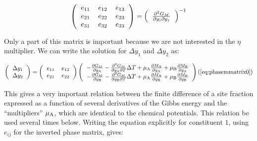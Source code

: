 \documentclass[12pt]{article}
\begin{document}
\[ \left(
\begin{tabular}{ccc}
$e_{11}$ & $e_{12}$ & $e_{13}$ \\
$e_{21}$ & $e_{22}$ & $e_{23}$ \\
$e_{31}$ & $e_{32}$ & $e_{33}$ \\
\end{tabular}
\right) 
=
\left(
\begin{tabular}{c}
$\frac{\partial^2 G_M}{\partial y_i\partial y_j}$
\end{tabular}
\right)^{-1} 
\]

Only a part of this matrix is important because we are not interested
in the $\eta$ multiplier.  We can write the solution for $\Delta
y_{1}$ and $\Delta y_{2}$ as:

\label{eq:phasemmatrix0}

\[ \left(
\begin{tabular}{c}
$\Delta y_{1}$\\
$\Delta y_{2}$\\
\end{tabular}
\right)
=
\left(
\begin{tabular}{cc}
$e_{11}$ & $e_{12}$  \\
$e_{21}$ & $e_{22}$  \\
\end{tabular}
\right)
\left(
\begin{tabular}{c}
$-\frac{\partial G_M}{\partial y_{\rm A}}
-\frac{\partial^2 G_M}{\partial y_{\rm A}\partial T}\Delta T
+\mu_{\rm A}\frac{\partial M_{\rm A}}{\partial y_{\rm A}}+
\mu_{\rm B}\frac{\partial M_{\rm B}}{\partial y_{\rm A}}$\\
$-\frac{\partial G_M}{\partial y_{\rm B}}
-\frac{\partial^2 G_M}{\partial y_{\rm B}\partial T}\Delta T
+\mu_{\rm A}\frac{\partial M_{\rm A}}{\partial y_{\rm B}}+
\mu_{\rm B}\frac{\partial M_{\rm B}}{\partial y_{\rm B}}$\\
\end{tabular}
\right)
\\
(\ref{eq:phasemmatrix0})
\]

This gives a very important relation between the finite difference of
a site fraction expressed as a function of several derivatives of the
Gibbs energy and the ``multipliers'' $\mu_{\rm A}$, which are
identical to the chemical potentials.  This relation be used several
times below.  Writing the equation explicitly for constituent $1$,
using $e_{ij}$ for the inverted phase matrix, gives:
\end{document}
